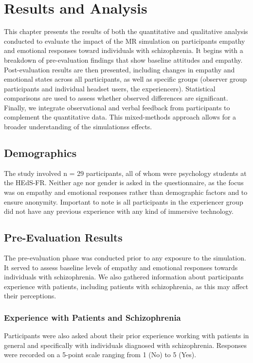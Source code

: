 \chapter{Results and Analysis}
\label{ch:resultsandanalysis}

This chapter presents the results of both the quantitative and qualitative analysis conducted to evaluate the impact of the MR simulation on participants empathy and emotional responses toward individuals with schizophrenia. It begins with a breakdown of pre-evaluation findings that show baseline attitudes and empathy. Post-evaluation results are then presented, including changes in empathy and emotional states across all participants, as well as specific groups (observer group participants and individual headset users, the experiencers). Statistical comparisons are used to assess whether observed differences are significant. Finally, we integrate observational and verbal feedback from participants to complement the quantitative data. This mixed-methods approach allows for a broader understanding of the simulationss effects.

\section{Demographics}
The study involved n = 29 participants, all of whom were psychology students at the HEdS-FR. Neither age nor gender is asked in the questionnaire, as the focus was on empathy and emotional responses rather than demographic factors and to ensure anonymity. Important to note is all participants in the experiencer group did not have any previous experience with any kind of immersive technology.

\section{Pre-Evaluation Results}
The pre-evaluation phase was conducted prior to any exposure to the simulation. It served to assess baseline levels of empathy and emotional responses towards individuals with schizophrenia. We also gathered information about participants experience with patients, including patients with schizophrenia, as this may affect their perceptions.

\subsection{Experience with Patients and Schizophrenia}

Participants were also asked about their prior experience working with patients in general and specifically with individuals diagnosed with schizophrenia. Responses were recorded on a 5-point scale ranging from 1 (No) to 5 (Yes).

